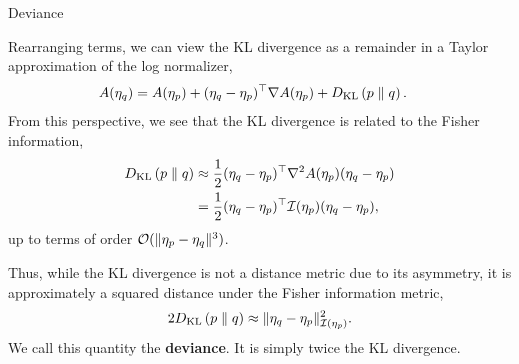 \documentclass[aspectratio=169]{beamer}
\begin{document}


    

\begin{frame}[t,allowframebreaks]{Deviance}\label{deviance}

Rearranging terms, we can view the KL divergence as a remainder in a
Taylor approximation of the log normalizer, \begin{align*}
A(\eta_q) 
&= A(\eta_p) + (\eta_q - \eta_p)^\top \nabla A(\eta_p) + D_{\textrm{KL}}\left(p\;\|\;q\right).
\end{align*} From this perspective, we see that the KL divergence is
related to the Fisher information, \begin{align*}
D_{\textrm{KL}}\left(p\;\|\;q\right) 
&\approx \frac{1}{2} (\eta_q - \eta_p)^\top \nabla^2 A(\eta_p) (\eta_q - \eta_p) \\
&= \frac{1}{2} (\eta_q - \eta_p)^\top \mathcal{I}(\eta_p) (\eta_q - \eta_p),
\end{align*} up to terms of order \(\mathcal{O}(\|\eta_p - \eta_q\|^3)\).

Thus, while the KL divergence is not a distance metric due to its
asymmetry, it is approximately a squared distance under the Fisher
information metric, \begin{align*}
2 D_{\textrm{KL}}\left(p\;\|\;q\right) \approx \|\eta_q - \eta_p\|_{\mathcal{I}(\eta_p)}^2.
\end{align*} We call this quantity the \textbf{deviance}. It is simply
twice the KL divergence.
\end{frame}
\end{document}
